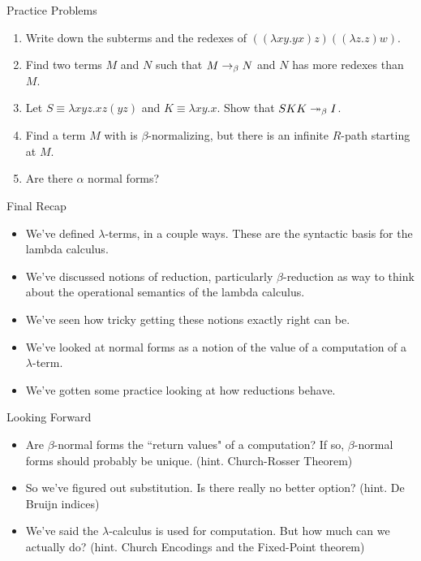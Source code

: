 \documentclass[10pt]{beamer}
\begin{document}
\begin{frame}{Practice Problems}

\begin{enumerate}
\item Write down the subterms and the redexes of $((\lambda x y. y x) z)((\lambda z . z) w)$.
\item Find two terms $M$ and $N$ such that $M \rightarrow_\beta N$ and $N$ has more redexes than $M$.
\item Let $S \equiv \lambda x y z . xz (yz)$ and $K \equiv \lambda x y . x$. Show that $SKK \twoheadrightarrow_\beta I$.
\item Find a term $M$ with is $\beta$-normalizing, but there is an infinite $R$-path starting at $M$.
\item Are there $\alpha$ normal forms?

\end{enumerate}

\end{frame}

\begin{frame}{Final Recap}
\begin{itemize}
\item We've defined $\lambda$-terms, in a couple ways. These are the syntactic basis for the lambda calculus.
\item We've discussed notions of reduction, particularly $\beta$-reduction as way to think about the operational semantics of the lambda calculus.
\item We've seen how tricky getting these notions exactly right can be.
\item We've looked at normal forms as a notion of the value of a computation of a $\lambda$-term.
\item We've gotten some practice looking at how reductions behave.
\end{itemize}
\end{frame}

\begin{frame}{Looking Forward}
\begin{itemize}
\item Are $\beta$-normal forms the ``return values" of a computation? If so, $\beta$-normal forms should probably be unique. (hint. Church-Rosser Theorem)
\item So we've figured out substitution. Is there really no better option? (hint. De Bruijn indices)
\item We've said the $\lambda$-calculus is used for computation. But how much can we actually do? (hint. Church Encodings and the Fixed-Point theorem)
\end{itemize}
\end{frame}
\end{document}
